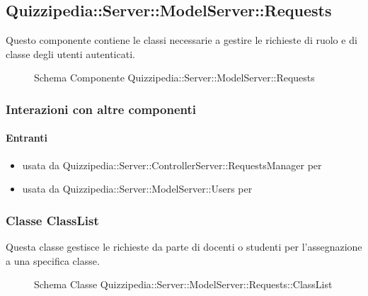 \subsection{Quizzipedia::Server::ModelServer::Requests}
Questo componente contiene le classi necessarie a gestire le richieste di ruolo e di classe degli utenti autenticati.
\begin{figure}[H]
\centering
\noindent{}
\caption[Schema Componente Quizzipedia::Server::ModelServer::Requests]{Schema Componente Quizzipedia::Server::ModelServer::Requests}
\end{figure}
\subsubsection{Interazioni con altre componenti}
\paragraph{Entranti}
\begin{itemize}
\item usata da Quizzipedia::Server::ControllerServer::RequestsManager per 
\item usata da Quizzipedia::Server::ModelServer::Users per 
\end{itemize}
\subsubsection{Classe ClassList}
Questa classe gestisce le richieste da parte di docenti o studenti per l'assegnazione a una specifica classe.
\begin{figure}[H]
\centering
\noindent{}
\caption[Schema Classe ClassList]{Schema Classe Quizzipedia::Server::ModelServer::Requests::ClassList}
\end{figure}
